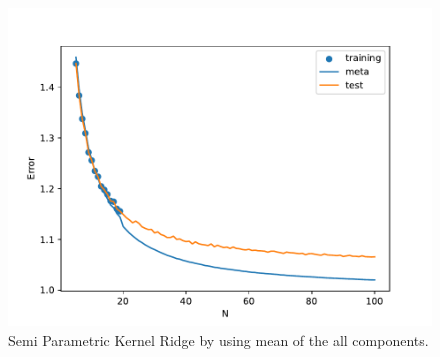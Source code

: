 \documentclass{tran-l}
\theoremstyle{definition}
\theoremstyle{remark}
\numberwithin{equation}{section}
\begin{document}
\begin{figure}[h!]
   \centering
   \includegraphics[width=\textwidth]{Figures/initial_study/lr_mean.pdf}
   \caption{Semi Parametric Kernel Ridge by using mean of the all components.}
\end{figure}
\end{document}
